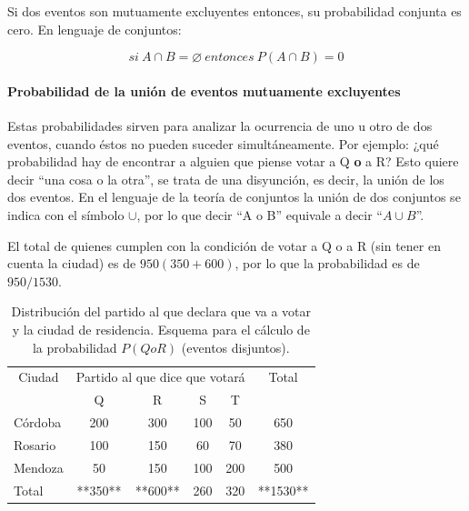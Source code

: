 \documentclass[]{article}
\let\oldparagraph\paragraph
\renewcommand{\paragraph}[1]{\oldparagraph{#1}\mbox{}}
\begin{document}
Si dos eventos son mutuamente excluyentes entonces, su probabilidad
conjunta es cero. En lenguaje de conjuntos:

\[si\ A \cap B = \varnothing\ entonces\ P(A \cap B) = 0\]

\hypertarget{probabilidad-de-la-uniuxf3n-de-eventos-mutuamente-excluyentes}{%
\paragraph{Probabilidad de la unión de eventos mutuamente
excluyentes}\label{probabilidad-de-la-uniuxf3n-de-eventos-mutuamente-excluyentes}}

Estas probabilidades sirven para analizar la ocurrencia de uno u otro de
dos eventos, cuando éstos no pueden suceder simultáneamente. Por
ejemplo: ¿qué probabilidad hay de encontrar a alguien que piense votar a
Q \textbf{o} a R? Esto quiere decir ``una cosa o la otra'', se trata de
una disyunción, es decir, la unión de los dos eventos. En el lenguaje de
la teoría de conjuntos la unión de dos conjuntos se indica con el
símbolo \(\cup\), por lo que decir ``A o B'' equivale a decir
``\(A\cup B\)''.

El total de quienes cumplen con la condición de votar a Q o a R (sin
tener en cuenta la ciudad) es de \(950 (350 + 600)\), por lo que la
probabilidad es de \(950/1530\).

\begin{table}

\caption{\label{tab:unnamed-chunk-19}Distribución del partido al que declara que va a votar y la ciudad de residencia. Esquema para el cálculo de la probabilidad $P(Q o R)$ (eventos disjuntos).}
\centering
\begin{tabular}[t]{lccccc}
\toprule
\multicolumn{1}{c}{Ciudad} & \multicolumn{4}{c}{Partido al que dice que votará} & \multicolumn{1}{c}{Total} \\
\cmidrule(l{3pt}r{3pt}){1-1} \cmidrule(l{3pt}r{3pt}){2-5} \cmidrule(l{3pt}r{3pt}){6-6}
 & Q & R & S & T & \\
\midrule
\rowcolor{gray!6}  Córdoba & 200 & 300 & 100 & 50 & 650\\
Rosario & 100 & 150 & 60 & 70 & 380\\
\rowcolor{gray!6}  Mendoza & 50 & 150 & 100 & 200 & 500\\
Total & **350** & **600** & 260 & 320 & **1530**\\
\bottomrule
\end{tabular}
\end{table}
\end{document}
